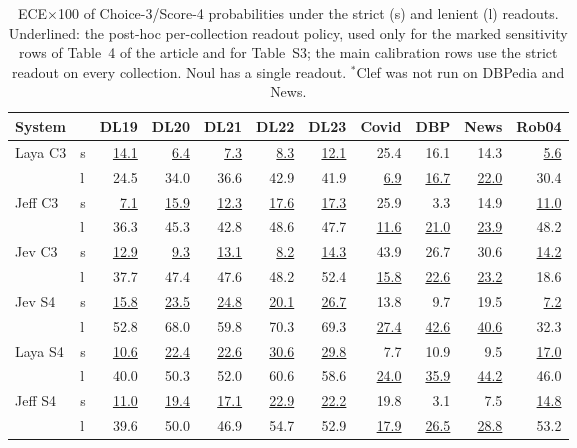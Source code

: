 \begin{table}[tp]
\centering
\scriptsize
\setlength{\tabcolsep}{2.2pt}
\caption{ECE$\times$100 of Choice-3/Score-4 probabilities under the strict (s) and lenient (l) readouts. Underlined: the post-hoc per-collection readout policy, used only for the marked sensitivity rows of Table~4 of the article and for Table~S3; the main calibration rows use the strict readout on every collection. Noul has a single readout. $^\ast$Clef was not run on DBPedia and News.}
\label{tab:readouts}
\begin{tabular}{llrrrrrrrrr}
\toprule
System & & DL19 & DL20 & DL21 & DL22 & DL23 & Covid & DBP & News & Rob04 \\
\midrule
Laya C3 & s & \underline{14.1} & \underline{6.4} & \underline{7.3} & \underline{8.3} & \underline{12.1} & 25.4 & 16.1 & 14.3 & \underline{5.6} \\
 & l & 24.5 & 34.0 & 36.6 & 42.9 & 41.9 & \underline{6.9} & \underline{16.7} & \underline{22.0} & 30.4 \\
Jeff C3 & s & \underline{7.1} & \underline{15.9} & \underline{12.3} & \underline{17.6} & \underline{17.3} & 25.9 & 3.3 & 14.9 & \underline{11.0} \\
 & l & 36.3 & 45.3 & 42.8 & 48.6 & 47.7 & \underline{11.6} & \underline{21.0} & \underline{23.9} & 48.2 \\
Jev C3 & s & \underline{12.9} & \underline{9.3} & \underline{13.1} & \underline{8.2} & \underline{14.3} & 43.9 & 26.7 & 30.6 & \underline{14.2} \\
 & l & 37.7 & 47.4 & 47.6 & 48.2 & 52.4 & \underline{15.8} & \underline{22.6} & \underline{23.2} & 18.6 \\
Jev S4 & s & \underline{15.8} & \underline{23.5} & \underline{24.8} & \underline{20.1} & \underline{26.7} & 13.8 & 9.7 & 19.5 & \underline{7.2} \\
 & l & 52.8 & 68.0 & 59.8 & 70.3 & 69.3 & \underline{27.4} & \underline{42.6} & \underline{40.6} & 32.3 \\
Laya S4 & s & \underline{10.6} & \underline{22.4} & \underline{22.6} & \underline{30.6} & \underline{29.8} & 7.7 & 10.9 & 9.5 & \underline{17.0} \\
 & l & 40.0 & 50.3 & 52.0 & 60.6 & 58.6 & \underline{24.0} & \underline{35.9} & \underline{44.2} & 46.0 \\
Jeff S4 & s & \underline{11.0} & \underline{19.4} & \underline{17.1} & \underline{22.9} & \underline{22.2} & 19.8 & 3.1 & 7.5 & \underline{14.8} \\
 & l & 39.6 & 50.0 & 46.9 & 54.7 & 52.9 & \underline{17.9} & \underline{26.5} & \underline{28.8} & 53.2 \\

\end{tabular}
\end{table}

